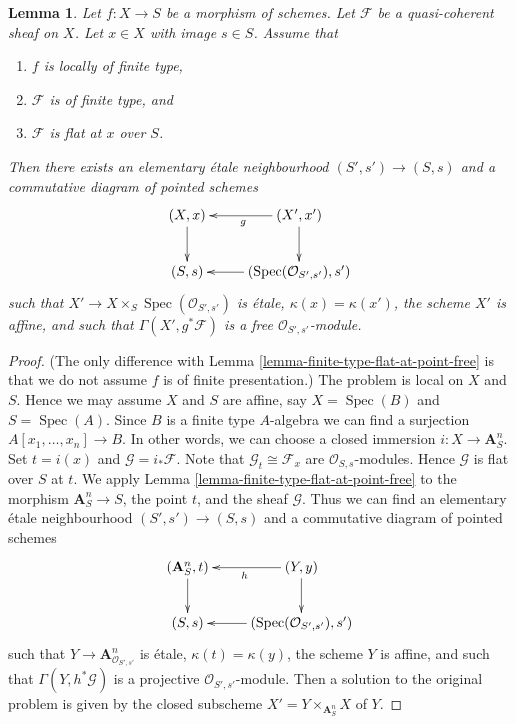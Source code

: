 \documentclass{amsart}
\theoremstyle{plain}
\newtheorem{lemma}[subsection]{Lemma}
\theoremstyle{definition}
\theoremstyle{remark}
\numberwithin{equation}{subsection}
\def\Spec{\mathop{\mathrm{Spec}}}
\begin{document}
\begin{lemma}
\label{lemma-finite-type-flat-at-point-free-variant}
Let $f : X \to S$ be a morphism of schemes.
Let $\mathcal{F}$ be a quasi-coherent sheaf on $X$.
Let $x \in X$ with image $s \in S$.
Assume that
\begin{enumerate}
\item $f$ is locally of finite type,
\item $\mathcal{F}$ is of finite type, and
\item $\mathcal{F}$ is flat at $x$ over $S$.
\end{enumerate}
Then there exists an elementary \'etale neighbourhood $(S', s') \to (S, s)$
and a commutative diagram of pointed schemes
$$
\xymatrix{
(X, x) \ar[d] & (X', x') \ar[l]^g \ar[d] \\
(S, s) & (\Spec(\mathcal{O}_{S', s'}), s') \ar[l]
}
$$
such that $X' \to X \times_S \Spec(\mathcal{O}_{S', s'})$
is \'etale, $\kappa(x) = \kappa(x')$, the scheme $X'$ is
affine, and such that $\Gamma(X', g^*\mathcal{F})$ is a free
$\mathcal{O}_{S', s'}$-module.
\end{lemma}

\begin{proof}
(The only difference with
Lemma \ref{lemma-finite-type-flat-at-point-free}
is that we do not assume $f$ is of finite presentation.)
The problem is local on $X$ and $S$. Hence we may assume $X$ and
$S$ are affine, say $X = \Spec(B)$ and $S = \Spec(A)$.
Since $B$ is a finite type $A$-algebra we can find a surjection
$A[x_1, \ldots, x_n] \to B$. In other words, we can choose a closed
immersion $i : X \to \mathbf{A}^n_S$. Set $t = i(x)$ and
$\mathcal{G} = i_*\mathcal{F}$. Note that $\mathcal{G}_t \cong \mathcal{F}_x$
are $\mathcal{O}_{S, s}$-modules. Hence $\mathcal{G}$ is flat over $S$ at $t$.
We apply
Lemma \ref{lemma-finite-type-flat-at-point-free}
to the morphism $\mathbf{A}^n_S \to S$, the point $t$, and the
sheaf $\mathcal{G}$. Thus we can find an
elementary \'etale neighbourhood $(S', s') \to (S, s)$
and a commutative diagram of pointed schemes
$$
\xymatrix{
(\mathbf{A}^n_S, t) \ar[d] & (Y, y) \ar[l]^h \ar[d] \\
(S, s) & (\Spec(\mathcal{O}_{S', s'}), s') \ar[l]
}
$$
such that $Y \to \mathbf{A}^n_{\mathcal{O}_{S', s'}}$
is \'etale, $\kappa(t) = \kappa(y)$, the scheme $Y$ is
affine, and such that $\Gamma(Y, h^*\mathcal{G})$ is a projective
$\mathcal{O}_{S', s'}$-module. Then a solution to the original
problem is given by the closed subscheme
$X' = Y \times_{\mathbf{A}^n_S} X$ of $Y$.
\end{proof}
\end{document}
